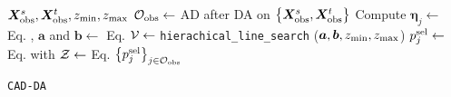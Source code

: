 \begin{algorithm}[!t]
\renewcommand{\algorithmicrequire}{\textbf{Input:}}
\renewcommand{\algorithmicensure}{\textbf{Output:}}
\begin{footnotesize}
 \begin{algorithmic}[1]
  \REQUIRE $\bm X^s_{\rm obs}, \bm X^t_{\rm obs}, z_{\rm min}, z_{\rm max}$
	\vspace{4pt}
	\STATE ${\mathcal O}_{\rm obs} \leftarrow$ AD after DA on $\big \{ \bm X^s_{\rm obs}, \bm X^t_{\rm obs} \big \} $
	\vspace{4pt}
		\vspace{4pt}
		\STATE Compute $\bm \eta_j \leftarrow$ Eq. , $\bm a$ and $\bm b \leftarrow$ Eq. 
		\vspace{4pt}
		\STATE ${\mathcal V} \leftarrow$ {\tt hierachical\_line\_search} ($\bm a, \bm b, z_{\rm min}, z_{\rm max}$)
		\vspace{4pt}
		\STATE $p^{\rm sel}_j \leftarrow$  Eq.  with ${\mathcal Z} \leftarrow$ Eq. 
		\vspace{4pt}
	\ENDFOR
	\vspace{4pt}
  \ENSURE $\big \{ p^{\rm sel}_j \big \}_{j \in {\mathcal O}_{\rm obs}}$ 
 \end{algorithmic}
\end{footnotesize}
\caption{{\tt CAD-DA}}
\label{alg:cad_da}
\end{algorithm}



